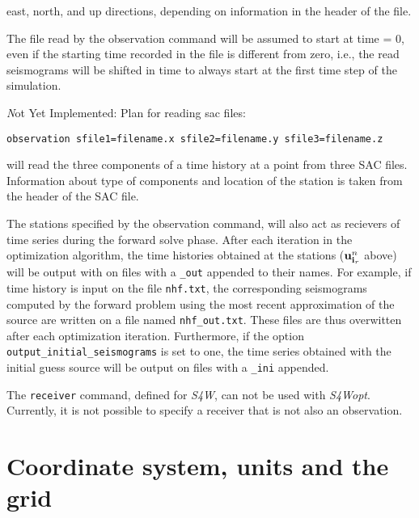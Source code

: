 \documentclass[11pt]{report}
\begin{document}
east, north, and up directions, depending on information in the header of the file.
\par
The file read by the observation command will be assumed to start at time = 0, even if the starting time recorded 
in the file is different from zero, i.e., the read seismograms will be shifted in time to always start at the first
time step of the simulation.
\par
{\emph Not Yet Implemented:}
Plan for reading sac files:
\begin{verbatim}
observation sfile1=filename.x sfile2=filename.y sfile3=filename.z
\end{verbatim}
will read the three components of a time history at a point from three SAC files. Information about type of
components and location of the station is taken from the header of the SAC file.
\par
The stations specified by the observation command, will also act as recievers of time series during the 
forward solve phase. After each iteration in the optimization algorithm, the time histories obtained at the stations 
(${\bf u}^n_{{\bf i}_r}$ above) will be output with on files with a {\tt \_out} appended to their names. For example,
if time history is input on the file {\tt nhf.txt}, the corresponding seismograms computed by the forward problem
using the most recent approximation of the source are written on a file named {\tt nhf\_out.txt}. These files are thus
overwitten after each optimization iteration. Furthermore, if the option {\tt output\_initial\_seismograms} is set to
one, the time series obtained with the initial guess source will be output on files with a {\tt \_ini} appended.
\par
The {\tt receiver} command, defined for \emph{S4W}, can not be used with \emph{S4Wopt}.  Currently, it is not possible to
specify a receiver that is not also an observation.

\chapter{Coordinate system, units and the grid}
\end{document}
